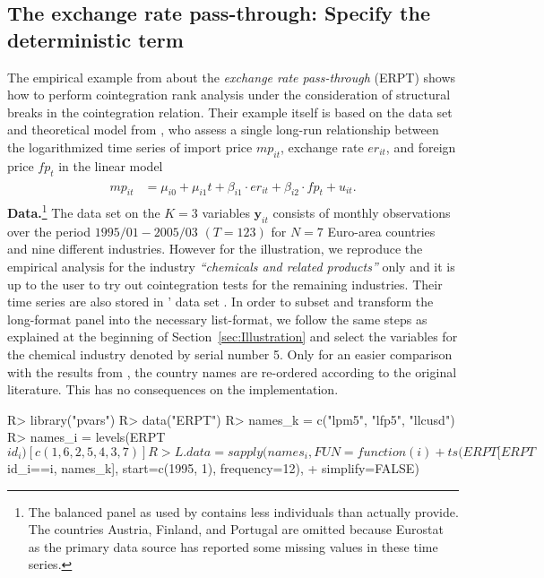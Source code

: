 \subsection{The exchange rate pass-through: Specify the deterministic term} \label{sec:ERPT}
The empirical example from \citet[Ch.~6]{ArsovaOersal2016} about the \textit{exchange rate pass-through} (ERPT) shows how to perform cointegration rank analysis under the consideration of structural breaks in the cointegration relation. Their example itself is based on the data set and theoretical model from \citet{BanerjeeSilvestre2015}, who assess a single long-run relationship between the logarithmized time series of import price $ m\!p_{it} $, exchange rate $ e\!r_{it} $, and foreign price $ f\!p_{t} $ in the linear model 
\begin{align} \label{eq:ERPT}
\begin{split}
	m\!p_{it} & = \mu_{i0} + \mu_{i1} t + \beta_{i1} \cdot e\!r_{it} + \beta_{i2} \cdot f\!p_{t} + u_{it}.
\end{split}
\end{align}
\textbf{Data.}\footnote{The balanced panel  as used by \citet{ArsovaOersal2016} contains less individuals than \citet{BanerjeeSilvestre2015} actually provide. The countries Austria, Finland, and Portugal are omitted because Eurostat as the primary data source has reported some missing values in these time series.} The data set on the $ K=3 $ variables $ \boldsymbol{y}_{it} $ consists of monthly observations over the period $1995/01 - 2005/03$ $(T=123)$ for $ N=7 $ Euro-area countries and nine different industries. However for the illustration, we reproduce the empirical analysis for the industry \textit{``chemicals and related products''} only and it is up to the user to try out cointegration tests for the remaining industries. Their time series are also stored in ' data set . In order to subset and transform the long-format panel  into the necessary list-format, we follow the same steps as explained at the beginning of Section~\ref{sec:Illustration} and select the variables for the chemical industry denoted by serial number 5. Only for an easier comparison with the results from \citet{ArsovaOersal2016}, the country names  are re-ordered according to the original literature. This has no consequences on the implementation.
\begin{CodeChunk}
\begin{CodeInput}
R> library("pvars")
R> data("ERPT")
R> names_k = c("lpm5", "lfp5", "llcusd")
R> names_i = levels(ERPT$id_i)[c(1,6,2,5,4,3,7)]
R> L.data  = sapply(names_i, FUN=function(i) 
+     ts(ERPT[ERPT$id_i==i, names_k], start=c(1995, 1), frequency=12), 
+     simplify=FALSE)
\end{CodeInput}
\end{CodeChunk}
